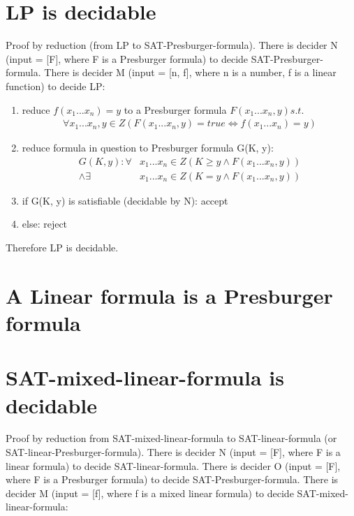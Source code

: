 \documentclass{article}
\begin{document}
\section{LP is decidable}
Proof by reduction (from LP to SAT-Presburger-formula).
There is decider N (input = [F], where F is a Presburger formula) to decide 
SAT-Presburger-formula.
There is decider M (input = [n, f], where n is a number, f is a linear 
function) to decide LP:
\begin{enumerate}
	\item reduce $ f(x_1...x_n) = y $ to a Presburger formula $ F(x_1...x_n, y) 
	s.t. $
	\begin{align*}
		\forall x_1...x_n, y \in Z (F(x_1...x_n,y) = true \iff f(x_1...x_n) =y)
	\end{align*}
	\item reduce formula in question to Presburger formula G(K, y):
	\begin{align*}
		G(K, y): \forall& x_1 ... x_n \in Z(K \ge y \land F(x_1 ... x_n, y)) \\
		\land \exists& x_1 ... x_n \in Z (K = y \land F(x_1 ... x_n, y))
	\end{align*}
	\item if G(K, y) is satisfiable (decidable by N): accept
	\item else: reject
\end{enumerate}
Therefore LP is decidable.

\section{A Linear formula is a Presburger formula}

\section{SAT-mixed-linear-formula is decidable}
Proof by reduction from SAT-mixed-linear-formula to SAT-linear-formula (or 
SAT-linear-Presburger-formula).
There is decider N (input = [F], where F is a linear formula) to decide 
SAT-linear-formula.
There is decider O (input = [F], where F is a Presburger formula) to decide 
SAT-Presburger-formula.
There is decider M (input = [f], where f is a mixed linear formula) to 
decide SAT-mixed-linear-formula:
\end{document}
